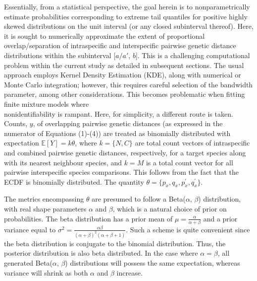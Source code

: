 \documentclass[12pt]{article}
\begin{document}
Essentially, from a statistical perspective, the goal herein is to nonparametrically estimate probabilities corresponding to extreme tail quantiles for positive highly skewed distributions on the unit interval  (or any closed subinterval thereof). Here, it is sought to numerically approximate the extent of proportional overlap/separation of intraspecific and interspecific pairwise genetic distance distributions within the subinterval [$a/a'$, $b$]. This is a challenging computational problem within the current study as detailed in subsequent sections. The usual approach employs Kernel Density Estimation (KDE), along with numerical or Monte Carlo integration; however, this requires careful selection of the bandwidth parameter, among other considerations. This becomes problematic when fitting finite mixture models where \\ nonidentifiability is rampant. Here, for simplicity, a different route is taken. Counts, $y$, of overlapping pairwise genetic distances (as expressed in the numerator of Equations (1)-(4)) are treated as binomially distributed with expectation $\mathbb{E}[Y] = k\theta$, where $k = \{N, C\}$ are total count vectors of intraspecific and combined pairwise genetic distances, respectively, for a target species along with its nearest neighbour species, and $k = M$ is a total count vector for all pairwise interspecific species comparisons. This follows from the fact that the ECDF is binomially distributed. The quantity $\theta = \{p_x, q_x, p^{'}_x, q^{'}_x\}$. 

The metrics encompassing $\theta$ are presumed to follow a Beta($\alpha$, $\beta$) distribution, with real shape parameters $\alpha$ and $\beta$, which is a natural choice of prior on probabilities. The beta distribution has a prior mean of $\mu = \frac{\alpha}{\alpha + \beta}$ and a prior variance equal to $\sigma^2 = \frac{\alpha\beta}{(\alpha + \beta)^2(\alpha + \beta + 1)}$. Such a scheme is quite convenient since the beta distribution is conjugate to the binomial distribution. Thus, the posterior distribution is also beta distributed. In the case where $\alpha = \beta$, all generated Beta($\alpha$, $\beta$) distributions will possess the same expectation, whereas variance will shrink as both $\alpha$ and $\beta$ increase.
\end{document}
